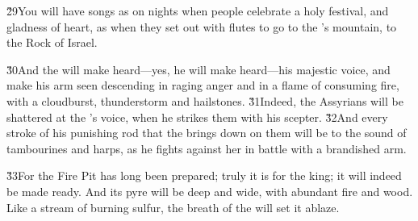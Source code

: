 \v{29}You will have songs as on nights when people celebrate a holy festival, and gladness of heart, as when they set out with flutes to go to the 's mountain, to the Rock of Israel.

\v{30}And the  will make heard---yes, he will make heard---his majestic voice, and make his arm seen descending in raging anger and in a flame of consuming fire, with a cloudburst, thunderstorm and hailstones. \v{31}Indeed, the Assyrians will be shattered at the 's voice, when he strikes them with his scepter. \v{32}And every stroke of his punishing rod that the  brings down on them will be to the sound of tambourines and harps, as he fights against her in battle with a brandished arm.

\v{33}For the Fire Pit has long been prepared; truly it is for the king; it will indeed be made ready. And its pyre will be deep and wide, with abundant fire and wood. Like a stream of burning sulfur, the breath of the  will set it ablaze.

